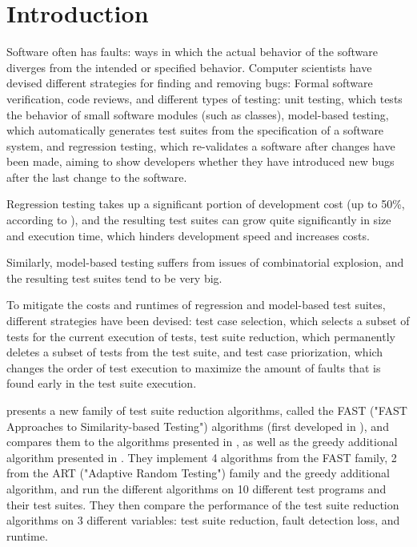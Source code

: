 
\chapter{Introduction}\label{chapter:introduction}

Software often has faults: ways in which the actual behavior of the
software diverges from the intended or specified behavior. Computer
scientists have devised different strategies for finding and removing
bugs: Formal software verification, code reviews, and different types of
testing: unit testing, which tests the behavior of small software modules
(such as classes), model-based testing, which automatically generates
test suites from the specification of a software system, and regression
testing, which re-validates a software after changes have been made,
aiming to show developers whether they have introduced new bugs after
the last change to the software.


Regression testing takes up a significant portion of development cost
(up to 50\%, according to \cite{ramler2006economic}), and the resulting
test suites can grow quite significantly in size and execution time,
which hinders development speed and increases costs.

Similarly, model-based testing suffers from issues of combinatorial explosion, %
and the resulting test suites tend to be very big.

To mitigate the costs and runtimes of regression and model-based test
suites, different strategies have been devised: test case selection,
which selects a subset of tests for the current execution of tests,
test suite reduction, which permanently deletes a subset of tests from
the test suite, and test case priorization, which changes the order of
test execution to maximize the amount of faults that is found early in
the test suite execution.

\cite{cruciani2019scalable} presents a new family of test
suite reduction algorithms, called the FAST ("FAST Approaches
to Similarity-based Testing") algorithms (first developed in
\cite{miranda2018fast}), and compares them to the algorithms presented
in \cite{chen2010adaptive}, as well as the greedy additional algorithm
presented in \cite{rothermel2001prioritizing}. They implement 4 algorithms
from the FAST family, 2 from the ART ("Adaptive Random Testing") family
and the greedy additional algorithm, and run the different algorithms
on 10 different test programs and their test suites. They then compare
the performance of the test suite reduction algorithms on 3 different
variables: test suite reduction, fault detection loss, and runtime.

